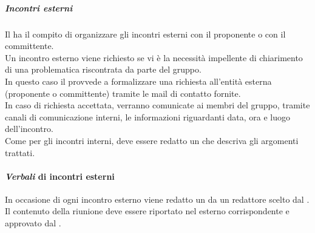 \subparagraph{Incontri esterni}
Il \roleProjectManagerLow{} ha il compito di organizzare gli incontri esterni con il proponente o con il committente.\\
Un incontro esterno viene richiesto se vi è la necessità impellente di chiarimento di una problematica riscontrata da parte del gruppo.\\
In questo caso il \roleProjectManagerLow{} provvede a formalizzare una richiesta all'entità esterna (proponente o committente) tramite le mail di contatto fornite.\\
In caso di richiesta accettata, verranno comunicate ai membri del gruppo, tramite canali di comunicazione interni, le informazioni riguardanti data, ora e luogo dell'incontro.\\
Come per gli incontri interni, deve essere redatto un \docNameVLow{} che descriva gli argomenti trattati.
\paragraph {\textit{Verbali} di incontri esterni}
In occasione di ogni incontro esterno viene redatto un \docNameVLow{} da un redattore scelto dal \roleProjectManagerLow. Il contenuto della riunione deve essere riportato nel \docNameVLow{} esterno corrispondente e approvato dal \roleProjectManagerLow.

